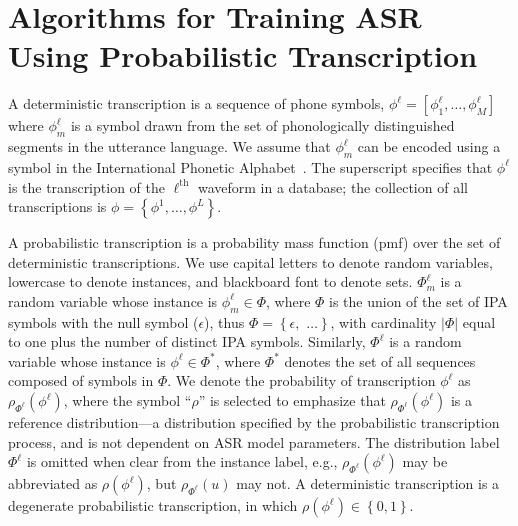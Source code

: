 \section{Algorithms for Training ASR Using Probabilistic Transcription}

A deterministic transcription is a sequence of phone symbols,
$\phi^\ell =[\phi_1^\ell,\ldots,\phi_M^\ell]$ where $\phi_m^\ell$ is a
symbol drawn from the set of phonologically distinguished segments in
the utterance language.  We assume that $\phi_m^\ell$ can be encoded
using a symbol in the International Phonetic Alphabet~\cite{ipa1993}.
The superscript specifies that $\phi^\ell$ is the transcription of the
$\ell^{\textrm{th}}$ waveform in a database; the collection of all
transcriptions is $\phi=\left\{\phi^1,\ldots,\phi^L\right\}$.

A probabilistic transcription is a probability mass function (pmf)
over the set of deterministic transcriptions.  We use capital letters
to denote random variables, lowercase to denote instances, and
blackboard font to denote sets.  $\Phi^{\ell}_m$ is a random variable
whose instance is $\phi_m^\ell\in\mathbb{\Phi}$, where $\mathbb{\Phi}$
is the union of the set of IPA symbols with the null symbol
($\epsilon$), thus $\mathbb{\Phi} =\left\{\right.\epsilon,$
\ipa{[a],[i],[2],[\ae],}$\left.\ldots\right\}$, with cardinality
$|\mathbb{\Phi}|$ equal to one plus the number of distinct IPA
symbols.  Similarly, $\Phi^{\ell}$ is a random variable whose instance
is $\phi^{\ell}\in\mathbb{\Phi}^*$, where $\mathbb{\Phi}^*$ denotes
the set of all sequences composed of symbols in $\mathbb{\Phi}$.  We
denote the probability of transcription $\phi^{\ell}$ as
$\rho_{\Phi^\ell}(\phi^{\ell})$, where the symbol ``$\rho$'' is
selected to emphasize that $\rho_{\Phi^\ell}(\phi^{\ell})$ is a
reference distribution---a distribution specified by the probabilistic
transcription process, and is not dependent on ASR model
parameters.  The distribution label $\Phi^\ell$ is omitted when clear
from the instance label, e.g., $\rho_{\Phi^\ell}(\phi^\ell)$ may be
abbreviated as $\rho(\phi^\ell)$, but $\rho_{\Phi^\ell}(u)$ may not.
A deterministic transcription is a degenerate probabilistic
transcription, in which $\rho(\phi^\ell)\in\left\{0,1\right\}$.

